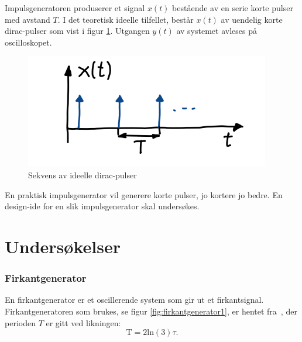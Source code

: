 \documentclass[a4paper,11pt,norsk]{article}
\begin{document}
Impulsgeneratoren produserer et signal $x(t)$ bestående av en serie korte pulser med avstand $T$. I
det teoretisk ideelle tilfellet, består $x(t)$ av uendelig korte dirac-pulser som vist i figur \ref{fig:3}. Utgangen
$y(t)$ av systemet avleses på oscilloskopet.

\begin{figure}[H]
  \centering
  \includegraphics[scale=0.7]{D1/Images/figur 3.png}
  \caption{Sekvens av ideelle dirac-pulser
}
  \label{fig:3}
\end{figure}

En praktisk impulsgenerator vil generere korte pulser, jo kortere jo bedre. En design-ide for
en slik impulsgenerator skal undersøkes.

\section{Undersøkelser}
\label{sec:undersøkelser}
\subsubsection{Firkantgenerator} %
\label{firkantgenerator}

En firkantgenerator er et oscillerende system som gir ut et firkantsignal. Firkantgeneratoren som brukes, se figur \ref{fig:firkantgenerator1}, er hentet fra~\cite{Ert-18}, der perioden $T$ er gitt ved likningen:
\begin{equation}
    \text{T} = 2\text{ln}(3)\tau.
    \label{eq:T_firkant}
\end{equation}
\end{document}
